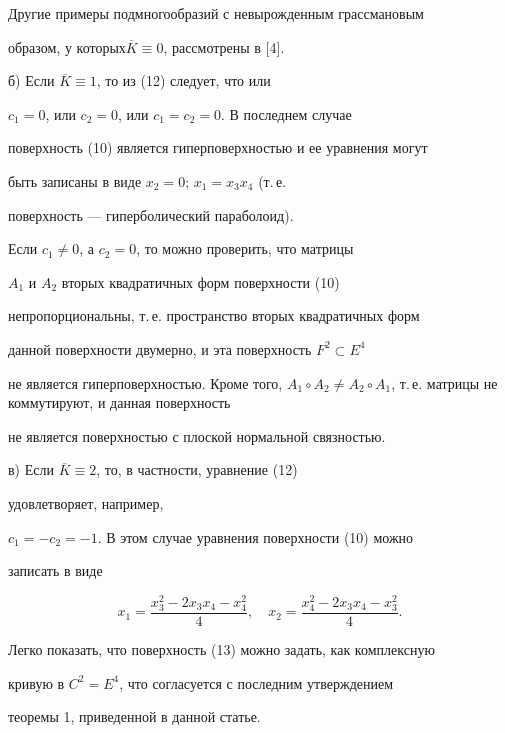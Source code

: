 \begin{examnonum}
Другие примеры подмногообразий с невырожденным грассмановым


образом, у которых\linebreak $\overline K\equiv 0$, рассмотрены в [4].





б) Если $\overline K\equiv 1$, то из (12) следует, что или


$c_{1}=0$, или $c_{2}=0$, или $c_{1}=c_{2}=0$. В последнем случае


поверхность (10) является гиперповерхностью и ее уравнения могут


быть записаны в виде $x_{2}=0$; $x_{1}=x_{3}x_{4}$ (т.\,е.


поверхность --- гиперболический параболоид).





Если $c_{1}\neq 0$, а $c_{2}=0$, то можно проверить, что матрицы


$A_{1}$ и $A_{2}$ вторых квадратичных форм поверхности (10)


непропорциональны, т.\,е. пространство вторых квадратичных форм


данной поверхности двумерно, и эта поверхность $F^{2}\subset E^{4}$


не является гиперповерхностью. Кроме того, $A_{1}\circ A_{2}\neq


A_{2}\circ A_{1}$, т.\,е. матрицы не коммутируют, и данная поверхность


не является поверхностью с плоской нормальной связностью.





в) Если $\overline K\equiv 2$, то, в частности, уравнение (12)


удовлетворяет, например,


$c_{1}=-c_{2}=-1$. В этом случае уравнения поверхности (10) можно


записать в виде


\begin{equation}


x_{1}= \frac{x_{3}^{2}-2x_{3}x_{4}-x_{4}^{2}}{4},\quad x_{2}=


\frac{x_{4}^{2}-2x_{3}x_{4}-x_{3}^{2}}{4}.


\end{equation}





Легко показать, что поверхность (13) можно задать, как комплексную


кривую в $C^{2}=E^{4}$, что согласуется с последним утверждением


теоремы 1, приведенной в данной статье.


\end{examnonum}





